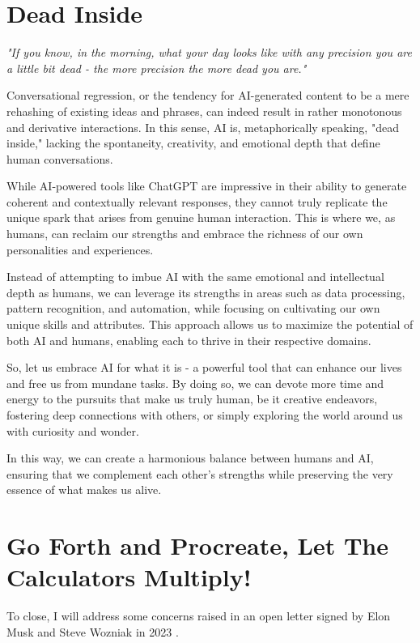 \section{Dead Inside}

\textit{"If you know, in the morning, what your day looks like with any precision you are a little bit dead - the more precision the more dead you are."}

Conversational regression, or the tendency for AI-generated content to be a mere rehashing of existing ideas and phrases, can indeed result in rather monotonous and derivative interactions. In this sense, AI is, metaphorically speaking, "dead inside," lacking the spontaneity, creativity, and emotional depth that define human conversations.

While AI-powered tools like ChatGPT are impressive in their ability to generate coherent and contextually relevant responses, they cannot truly replicate the unique spark that arises from genuine human interaction. This is where we, as humans, can reclaim our strengths and embrace the richness of our own personalities and experiences.

Instead of attempting to imbue AI with the same emotional and intellectual depth as humans, we can leverage its strengths in areas such as data processing, pattern recognition, and automation, while focusing on cultivating our own unique skills and attributes. This approach allows us to maximize the potential of both AI and humans, enabling each to thrive in their respective domains.

So, let us embrace AI for what it is - a powerful tool that can enhance our lives and free us from mundane tasks. By doing so, we can devote more time and energy to the pursuits that make us truly human, be it creative endeavors, fostering deep connections with others, or simply exploring the world around us with curiosity and wonder.

In this way, we can create a harmonious balance between humans and AI, ensuring that we complement each other's strengths while preserving the very essence of what makes us alive.

\section{Go Forth and Procreate, Let The Calculators Multiply!}

To close, I will address some concerns raised in an open letter signed by Elon Musk and Steve Wozniak in 2023 . 

